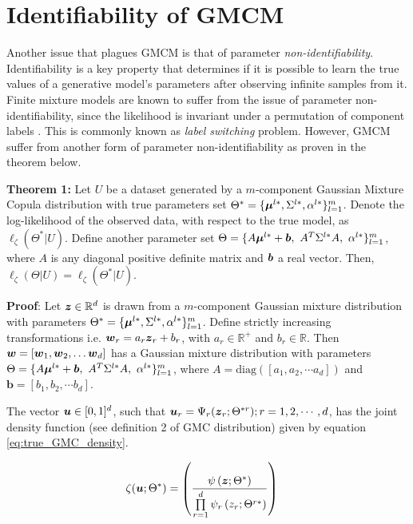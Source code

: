 \documentclass{article}
\begin{document}
\section{Identifiability of GMCM}\label{sec:identifiability_GMCM}

Another issue that plagues GMCM is that of parameter \emph{non-identifiability}. Identifiability is a key property that determines if it is possible to learn the true values of a generative model's parameters after observing infinite samples from it. Finite mixture models are known to suffer from the issue of parameter non-identifiability, since the likelihood is invariant under a permutation of component labels \citep[see][]{Stephens2000}. This is commonly known as \emph{label switching} problem. However, GMCM suffer from another form of parameter non-identifiability as proven in the theorem below.

  

\textbf{Theorem 1:} Let $U$ be a dataset generated by a $m$-component Gaussian Mixture Copula distribution with true parameters set $\Theta^* = \{\boldsymbol{\mu}^{l*}, \Sigma^{l*}, \alpha^{l*}\}_{l=1}^m$. Denote the log-likelihood of the observed data, with respect to the true model, as $\ell_\zeta(\Theta^*|U)$. Define another parameter set $\Theta= \{A\bs{\mu}^{l*}+\bs{b}, \ A^T\Sigma^{l*}A, \ \alpha^{l*}\}_{l=1}^m$, where $A$ is any diagonal positive definite matrix and $\boldsymbol{b}$ a real vector. Then, $\ell_\zeta(\Theta|U) = \ell_\zeta(\Theta^*|U)$.

 

\textbf{Proof}:  Let $\boldsymbol{z}\in \mathbb{R}^d$ is drawn from a $m$-component Gaussian mixture distribution with parameters $\Theta^* = \{\boldsymbol{\mu}^{l*}, \Sigma^{l*}, \alpha^{l*}\}_{l=1}^m$. Define strictly increasing transformations i.e. $\boldsymbol{w}_r = a_r \boldsymbol{z}_r+b_r$, with $a_r \in \mathbb{R}^+$ and $b_r \in \mathbb{R}$. Then $\boldsymbol{w}= [\boldsymbol{w}_1, \boldsymbol{w}_2,\ldots \boldsymbol{w}_d]$  has a Gaussian mixture distribution with parameters  $\Theta= \{A\bs{\mu}^{l*}+\bs{b}, \ A^T\Sigma^{l*}A, \ \alpha^{l*}\}_{l=1}^m$, where $A = \text{diag}([a_1, a_2, \cdots a_d])$ and $\textbf{b}=[b_1, b_2, \cdots b_d]$.

 

The vector $\boldsymbol{u}\in [0,1]^d$, such that $\boldsymbol{u}_r = \Psi_r(\boldsymbol{z}_r;\Theta^{*r}); r=1,2,\cdots, d $, has the joint density function (see definition 2 of GMC distribution) given by equation \eqref{eq:true_GMC_density}.

\begin{align}\label{eq:true_GMC_density}
\zeta(\boldsymbol{u};\Theta^*) & = \left( \frac{\psi\left(\boldsymbol{z};\Theta^*\right)}{\prod\limits_{r=1}^{d}\psi_r\left(z_r;\Theta^{r*} \right)} \right)
\end{align}
\end{document}
